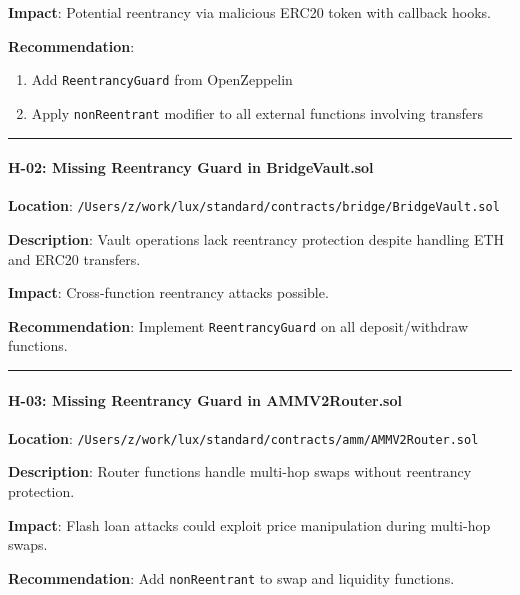 \documentclass[
]{article}
\providecommand{\tightlist}{%
  \setlength{\itemsep}{0pt}\setlength{\parskip}{0pt}}
\begin{document}
\textbf{Impact}: Potential reentrancy via malicious ERC20 token with
callback hooks.

\textbf{Recommendation}:

\begin{enumerate}
\def\labelenumi{\arabic{enumi}.}
\tightlist
\item
  Add \texttt{ReentrancyGuard} from OpenZeppelin
\item
  Apply \texttt{nonReentrant} modifier to all external functions
  involving transfers
\end{enumerate}

\begin{center}\rule{0.5\linewidth}{0.5pt}\end{center}

\paragraph{H-02: Missing Reentrancy Guard in
BridgeVault.sol}\label{h-02-missing-reentrancy-guard-in-bridgevaultsol}

\textbf{Location}:
\texttt{/Users/z/work/lux/standard/contracts/bridge/BridgeVault.sol}

\textbf{Description}: Vault operations lack reentrancy protection
despite handling ETH and ERC20 transfers.

\textbf{Impact}: Cross-function reentrancy attacks possible.

\textbf{Recommendation}: Implement \texttt{ReentrancyGuard} on all
deposit/withdraw functions.

\begin{center}\rule{0.5\linewidth}{0.5pt}\end{center}

\paragraph{H-03: Missing Reentrancy Guard in
AMMV2Router.sol}\label{h-03-missing-reentrancy-guard-in-ammv2routersol}

\textbf{Location}:
\texttt{/Users/z/work/lux/standard/contracts/amm/AMMV2Router.sol}

\textbf{Description}: Router functions handle multi-hop swaps without
reentrancy protection.

\textbf{Impact}: Flash loan attacks could exploit price manipulation
during multi-hop swaps.

\textbf{Recommendation}: Add \texttt{nonReentrant} to swap and liquidity
functions.
\end{document}
